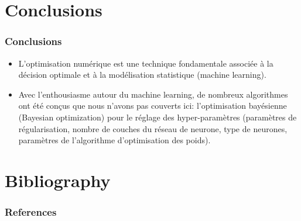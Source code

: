 \documentclass[12pt]{beamer}
\begin{document}
\section*{Conclusions}

\begin{frame}
\frametitle{Conclusions}
\begin{itemize}
\item L'optimisation numérique est une technique fondamentale associée à la décision optimale et à la modélisation statistique (machine learning).
\item Avec l'enthousiasme autour du machine learning, de nombreux algorithmes ont été conçus que nous n'avons pas couverts ici: l'optimisation bayésienne (Bayesian optimization) pour le réglage des hyper-paramètres (paramètres de régularisation, nombre de couches du réseau de neurone, type de neurones, paramètres de l'algorithme d'optimisation des poids).
\end{itemize}
\end{frame}

\section{Bibliography}

\begin{frame}[allowframebreaks]
\frametitle{References}
\scriptsize
%   
   
   
\end{frame}
\end{document}
